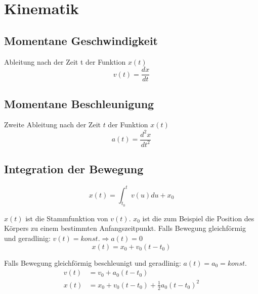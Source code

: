\documentclass[11pt]{article}
\begin{document}
\section{Kinematik}

\subsection{Momentane Geschwindigkeit}

Ableitung nach der Zeit t der Funktion $x(t)$
\begin{equation*}
	v(t) = \frac{dx}{dt}
\end{equation*}

\subsection{Momentane Beschleunigung}

Zweite Ableitung nach der Zeit $t$ der Funktion $x(t)$
\begin{equation*}
	a(t) = \frac{d^2x}{dt^2}
\end{equation*}

\subsection{Integration der Bewegung}

\begin{equation*}
	x(t) = \int_{t_0}^{t}v(u)du + x_0
\end{equation*}

$x(t)$ ist die Stammfunktion von $v(t)$. $x_0$ ist die zum Beispiel die Position des K{\"o}rpers zu einem bestimmten Anfangszeitpunkt.\newline
Falls Bewegung gleichf{\"o}rmig und geradlinig: $v(t) = konst. \Rightarrow a(t) = 0$ \newline
\begin{equation*}
	x(t) = x_0 + v_0(t - t_0)
\end{equation*}

Falls Bewegung gleichf{\"o}rmig beschleunigt und geradlinig: $a(t) = a_0 = konst.$ \newline
\begin{equation*}
\begin{split}
		v(t)& = v_0 + a_0(t - t_0)\\
	x(t)& = x_0 + v_0(t - t_0) + \frac{1}{2}a_0(t - t_0)^2
\end{split}
\end{equation*}
\end{document}
